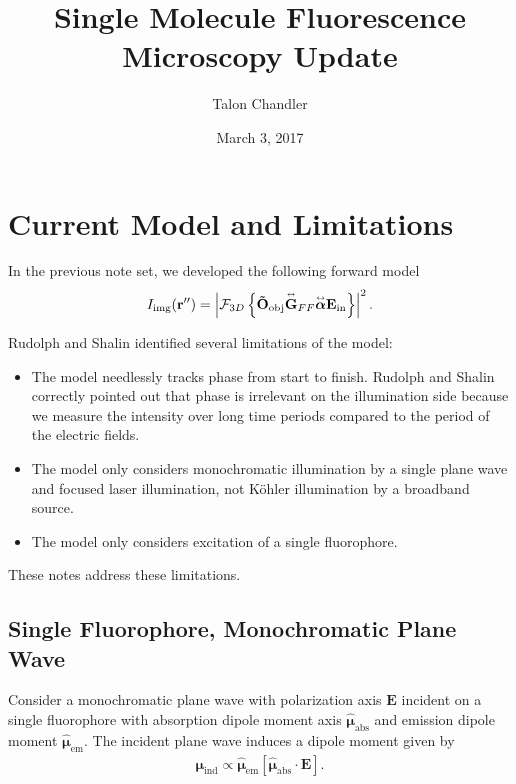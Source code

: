 \documentclass[11pt]{article}
\providecommand{\mb}[1]{\mathbf{#1}}
\providecommand{\bs}[1]{\boldsymbol{#1}}
\newcommand{\tensor}[1]{\overset{\text{\tiny$\leftrightarrow$}}{\mb{#1}}}
\begin{document}
\title{\vspace{-2.5em}Single Molecule Fluorescence Microscopy Update\vspace{-1em}}
\author{Talon Chandler}%
\date{\vspace{-1em}March 3, 2017\vspace{-1em}}
\maketitle

\section{Current Model and Limitations}
In the previous note set, we developed the following forward model
\begin{align}
  I_{\text{img}}(\mb{r''}) = \left|\mathcal{F}_{3D}\left\{
    \mb{\tilde{O}}_{\text{obj}}\tensor{\mathbf{G}}_{FF}\tensor{\bs{\alpha}}\mb{E}_{\text{in}}
  \right\}
  \right|^2.\label{eq:5}
\end{align}

Rudolph and Shalin identified several limitations of the model:
\begin{itemize}
\item The model needlessly tracks phase from start to finish. Rudolph and Shalin
  correctly pointed out that phase is irrelevant on the illumination side
  because we measure the intensity over long time periods compared to the period
  of the electric fields.
\item The model only considers monochromatic illumination by a single plane wave
  and focused laser illumination, not K\"{o}hler illumination by a broadband
  source.
\item The model only considers excitation of a single fluorophore. 
\end{itemize}
These notes address these limitations. 

\subsection{Single Fluorophore, Monochromatic Plane Wave}
Consider a monochromatic plane wave with polarization axis $\mb{E}$
incident on a single fluorophore with absorption dipole moment axis
$\hat{\bs{\mu}}_{\text{abs}}$ and emission dipole moment
$\hat{\bs{\mu}}_{\text{em}}$. The incident plane wave induces a dipole moment given by
\begin{align}
  \bs{\mu}_{\text{ind}} \propto \hat{\bs{\mu}}_{\text{em}} \left[\hat{\bs{\mu}}_{\text{abs}}\cdot \mb{E}\right].
\end{align}
\end{document}
